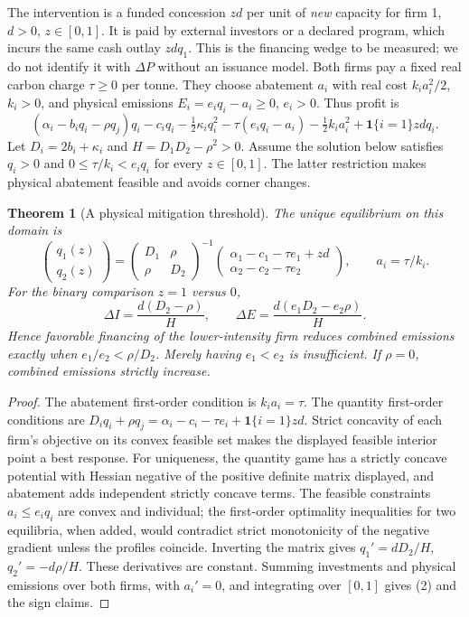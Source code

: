 \documentclass[11pt]{article}
\newtheorem{theorem}{Theorem}
\newcommand{\Ind}{\mathbf 1}
\begin{document}
The intervention is a funded concession $z d$ per unit of \emph{new}
capacity for firm 1, $d>0$, $z\in[0,1]$. It is paid by external investors
or a declared program, which incurs the same cash outlay $zdq_1$.
This is the financing wedge to be measured; we do not identify it with
$\Delta P$ without an issuance model. Both firms pay a fixed real carbon
charge $\tau\geq0$ per tonne. They choose abatement $a_i$ with real cost
$k_i a_i^2/2$, $k_i>0$, and physical emissions
$E_i=e_iq_i-a_i\geq0$, $e_i>0$. Thus profit is
\[
 (\alpha_i-b_iq_i-\rho q_j)q_i-c_iq_i-\tfrac12\kappa_iq_i^2
 -\tau(e_iq_i-a_i)-\tfrac12k_ia_i^2+\Ind\{i=1\}zdq_i.
\]
Let $D_i=2b_i+\kappa_i$ and
$H=D_1D_2-\rho^2>0$. Assume the solution below satisfies $q_i>0$
and $0\leq\tau/k_i<e_iq_i$ for every $z\in[0,1]$. The latter
restriction makes physical abatement feasible and avoids corner changes.

\begin{theorem}[A physical mitigation threshold]\label{real}
The unique equilibrium on this domain is
\[
 \begin{pmatrix}q_1(z)\\q_2(z)\end{pmatrix}
 =\begin{pmatrix}D_1&\rho\\\rho&D_2\end{pmatrix}^{-1}
 \begin{pmatrix}\alpha_1-c_1-\tau e_1+zd\\
                 \alpha_2-c_2-\tau e_2\end{pmatrix},
 \qquad a_i=\tau/k_i.
\]
For the binary comparison $z=1$ versus $0$,
\[
 \Delta I=\frac{d(D_2-\rho)}{H},\qquad
 \Delta E=\frac{d(e_1D_2-e_2\rho)}{H}.              \tag{2}
\]
Hence favorable financing of the lower-intensity firm reduces combined
emissions exactly when $e_1/e_2<\rho/D_2$. Merely having $e_1<e_2$
is insufficient. If $\rho=0$, combined emissions strictly increase.
\end{theorem}
\begin{proof}
The abatement first-order condition is $k_ia_i=\tau$. The quantity
first-order conditions are $D_iq_i+\rho q_j=
\alpha_i-c_i-\tau e_i+\Ind\{i=1\}zd$. Strict concavity of each
firm's objective on its convex feasible set makes the displayed feasible
interior point a best response. For uniqueness, the quantity game has a
strictly concave potential with Hessian negative of the positive definite
matrix displayed, and abatement adds independent strictly concave terms.
The feasible constraints $a_i\leq e_iq_i$ are convex and individual;
the first-order optimality inequalities for two equilibria, when added,
would contradict strict monotonicity of the negative gradient unless the
profiles coincide. Inverting the matrix gives
$q_1'=dD_2/H$, $q_2'=-d\rho/H$. These derivatives are constant.
Summing investments and physical emissions over both firms, with
$a_i'=0$, and integrating over $[0,1]$ gives (2) and the sign claims.
\end{proof}
\end{document}

